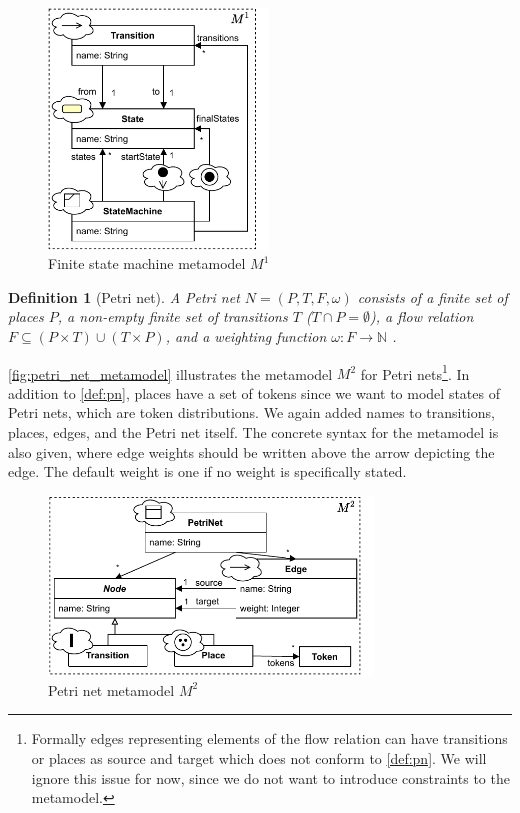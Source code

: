 \documentclass[conference]{IEEEtran}
\newtheorem{definition}{Definition}
\begin{document}
\begin{figure}[h]
    \centering
    \includegraphics[width=2.3in]{state_machine_metamodel}
    \caption{Finite state machine metamodel $M^1$}
    \label{fig:fsm_metamodel}
\end{figure}

\begin{definition}[Petri net] \label{def:pn}
    A Petri net $N=(P,T,F, \omega)$ consists of a finite set of places $P$, a non-empty finite set of transitions $T$ ($T \cap P = \emptyset $), a flow relation $F \subseteq (P \times T) \cup (T \times P)$, and a weighting function $\omega: F \to \mathbb{N}$ \cite{kunzeBehaviouralModelsModelling2016}. %
\end{definition}

\autoref{fig:petri_net_metamodel} illustrates the metamodel $M^2$ for Petri nets\footnote{Formally edges representing elements of the flow relation can have transitions or places as source and target which does not conform to \autoref{def:pn}.
We will ignore this issue for now, since we do not want to introduce constraints to the metamodel.}.
In addition to \autoref{def:pn}, places have a set of tokens since we want to model states of Petri nets, which are token distributions.
We again added names to transitions, places, edges, and the Petri net itself.
The concrete syntax for the metamodel is also given, where edge weights should be written above the arrow depicting the edge.
The default weight is one if no weight is specifically stated.

\begin{figure}[h]
    \centering
    \includegraphics[width=3.4in]{petri_net_metamodel}
    \caption{Petri net metamodel $M^2$}
    \label{fig:petri_net_metamodel}
\end{figure}
\end{document}

